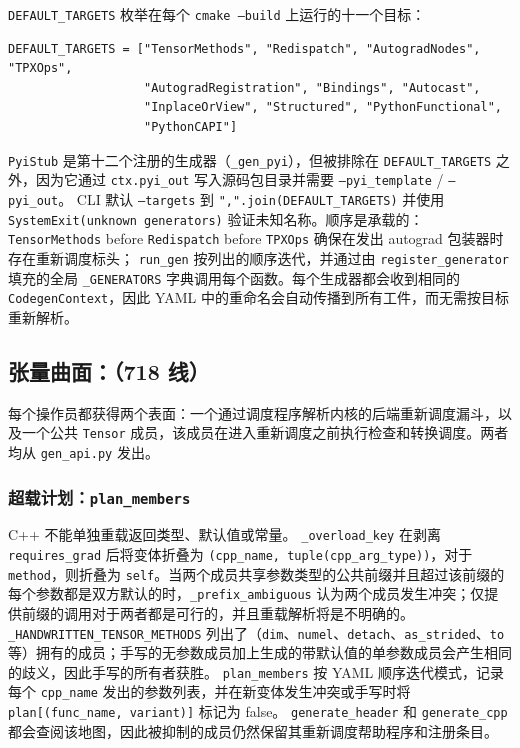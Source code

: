 \texttt{DEFAULT\_TARGETS} 枚举在每个 \texttt{cmake --build} 上运行的十一个目标：

\begin{lstlisting}[caption={default target list.}, label=lst:defaulttargets, style=pystyle]
DEFAULT_TARGETS = ["TensorMethods", "Redispatch", "AutogradNodes", "TPXOps",
                   "AutogradRegistration", "Bindings", "Autocast",
                   "InplaceOrView", "Structured", "PythonFunctional",
                   "PythonCAPI"]
\end{lstlisting}

\texttt{PyiStub} 是第十二个注册的生成器（\texttt{\_gen\_pyi}），但被排除在 \texttt{DEFAULT\_TARGETS} 之外，因为它通过 \texttt{ctx.pyi\_out} 写入源码包目录并需要 \texttt{--pyi\_template} / \texttt{--pyi\_out}。 CLI 默认 \texttt{--targets} 到 \texttt{",".join(DEFAULT\_TARGETS)} 并使用 \texttt{SystemExit(unknown generators)} 验证未知名称。顺序是承载的： \texttt{TensorMethods} before \texttt{Redispatch} before \texttt{TPXOps} 确保在发出 autograd 包装器时存在重新调度标头； \texttt{run\_gen} 按列出的顺序迭代，并通过由 \texttt{register\_generator} 填充的全局 \texttt{\_GENERATORS} 字典调用每个函数。每个生成器都会收到相同的 \texttt{CodegenContext}，因此 YAML 中的重命名会自动传播到所有工件，而无需按目标重新解析。

\subsection{张量曲面：（718 线）}

每个操作员都获得两个表面：一个通过调度程序解析内核的后端重新调度漏斗，以及一个公共 \texttt{Tensor} 成员，该成员在进入重新调度之前执行检查和转换调度。两者均从 \texttt{gen\_api.py} 发出。

\subsubsection{超载计划：\texttt{plan\_members}}

C++ 不能单独重载返回类型、默认值或常量。 \texttt{\_overload\_key} 在剥离 \texttt{requires\_grad} 后将变体折叠为 \texttt{(cpp\_name, tuple(cpp\_arg\_type))}，对于 \texttt{method}，则折叠为 \texttt{self}。当两个成员共享参数类型的公共前缀并且超过该前缀的每个参数都是双方默认的时，\texttt{\_prefix\_ambiguous} 认为两个成员发生冲突；仅提供前缀的调用对于两者都是可行的，并且重载解析将是不明确的。 \texttt{\_HANDWRITTEN\_TENSOR\_METHODS} 列出了（\texttt{dim}、\texttt{numel}、\texttt{detach}、\texttt{as\_strided}、\texttt{to} 等）拥有的成员；手写的无参数成员加上生成的带默认值的单参数成员会产生相同的歧义，因此手写的所有者获胜。 \texttt{plan\_members} 按 YAML 顺序迭代模式，记录每个 \texttt{cpp\_name} 发出的参数列表，并在新变体发生冲突或手写时将 \texttt{plan[(func\_name, variant)]} 标记为 false。 \texttt{generate\_header} 和 \texttt{generate\_cpp} 都会查阅该地图，因此被抑制的成员仍然保留其重新调度帮助程序和注册条目。

